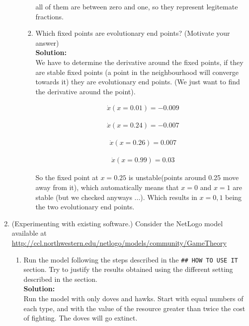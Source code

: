 \documentclass[a4paper]{article}
\begin{document}
\begin{enumerate}
\begin{enumerate}
\begin{enumerate}
				all of them are between zero and one, so they represent legitemate fractions.
				\item Which fixed points are evolutionary end points? (Motivate your answer)\\
				\textbf{Solution:}\\
				We have to determine the derivative around the fixed points, if they are stable fixed points (a point in the neighbourhood will converge towards it) they are evolutionary end points. (We just want to find the derivative around the point).
				
				\begin{align}
				    \dot{x}(x = 0.01) = - 0.009
				\end{align}
				
				
				\begin{align}
				    \dot{x}(x = 0.24) = -0.007
				\end{align}
				
				\begin{align}
				    \dot{x}(x = 0.26) = 0.007
				\end{align}
				
				\begin{align}
				    \dot{x}(x = 0.99) = 0.03
				\end{align}
				
				So the fixed point at $x=0.25$ is unstable(points around 0.25 move away from it), which automatically means that $x=0$ and $x=1$ are stable (but we checked anyways ...). Which results in $x = 0, 1$ being the two evolutionary end points.
				
			\end{enumerate}
	\end{enumerate}	
	
	
	\item (Experimenting with existing software.) Consider the NetLogo model available at\\ \url{http://ccl.northwestern.edu/netlogo/models/community/GameTheory}	
	
	\begin{enumerate}
		\item Run the model following the steps described in the \texttt{\#\# HOW TO USE IT} section. Try to justify the results obtained using the different setting described in the section.\\
		\textbf{Solution:}\\
		
		Run the model with only doves and hawks. Start with equal numbers of each type, and with the value of the resource greater than twice the cost of fighting. The doves will go extinct.


\end{enumerate}
\end{enumerate}
\end{document}
